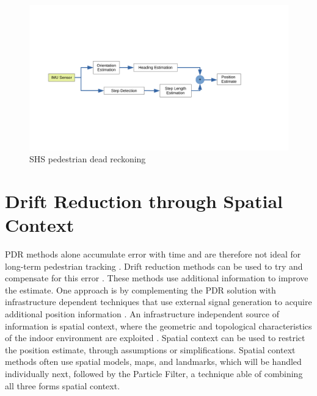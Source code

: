 \label{sec:rw-SHS}
\begin{figure}[H]
	\centering
	\includegraphics[trim=40 120 140 100, clip,width=\linewidth]{images/shs_diagram}
	\caption{\ac{SHS} pedestrian dead reckoning}
	\label{fig:shs_diagram}
\end{figure}


\section{Drift Reduction through Spatial Context}
\label{sec:rw-drift_reduction}
PDR methods alone accumulate error with time and are therefore not ideal for long-term pedestrian tracking \cite{Hardegger2012}. Drift reduction methods can be used to try and compensate for this error \cite{MunozDiaz2019a}.  These methods use additional information to improve the estimate. One approach is by complementing the \ac{PDR} solution with infrastructure dependent techniques that use external signal generation to acquire additional position information \cite{Qian2015}. An infrastructure independent source of information is spatial context, where the geometric and topological characteristics of the indoor environment are exploited \cite{Gu2019}. Spatial context can be used to restrict the position estimate, through assumptions or simplifications. Spatial context methods often use spatial models, maps, and landmarks, which will be handled individually next, followed by the Particle Filter, a technique able of combining all three forms spatial context. \par

